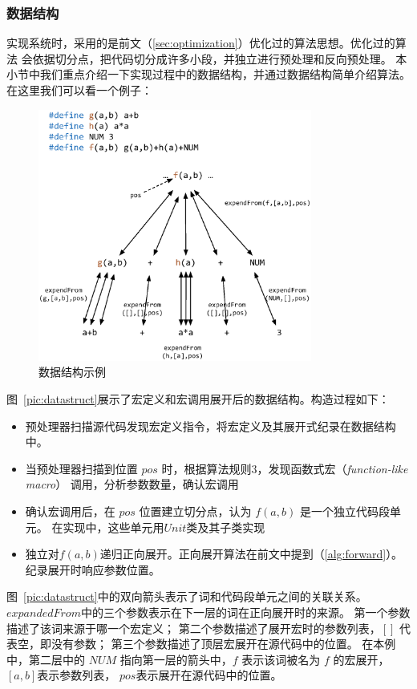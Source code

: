 \subsubsection{数据结构}\label{sec:datastruct}
实现系统时，采用的是前文（\ref{sec:optimization}）优化过的算法思想。优化过的算法
会依据切分点，把代码切分成许多小段，并独立进行预处理和反向预处理。
本小节中我们重点介绍一下实现过程中的数据结构，并通过数据结构简单介绍算法。
在这里我们可以看一个例子：
\begin{figure}
\centering
\includegraphics[width=9cm]{pics/original.eps}
\caption{数据结构示例}
\end{figure}
\label{pic:datastruct}
图~\ref{pic:datastruct}展示了宏定义和宏调用展开后的数据结构。构造过程如下：
\begin{itemize}
\item 预处理器扫描源代码发现宏定义指令，将宏定义及其展开式纪录在数据结构中。
\item 当预处理器扫描到位置 $pos$ 时，根据算法规则3，发现函数式宏（\emph{function-like macro}）
  调用，分析参数数量，确认宏调用
\item 确认宏调用后，在 $pos$ 位置建立切分点，认为 $f(a, b)$ 是一个独立代码段单元。
  在实现中，这些单元用$Unit$类及其子类实现
\item 独立对$f(a, b)$递归正向展开。正向展开算法在前文中提到（\ref{alg:forward}）。
  纪录展开时响应参数位置。
\end{itemize}

图~\ref{pic:datastruct}中的双向箭头表示了词和代码段单元之间的关联关系。
$expandedFrom$中的三个参数表示在下一层的词在正向展开时的来源。
第一个参数描述了该词来源于哪一个宏定义；
第二个参数描述了展开宏时的参数列表，$[]$ 代表空，即没有参数；
第三个参数描述了顶层宏展开在源代码中的位置。
在本例中，第二层中的 $NUM$ 指向第一层的箭头中，$f$ 表示该词被名为 $f$ 的宏展开，
$[a, b]$表示参数列表， $pos$表示展开在源代码中的位置。

